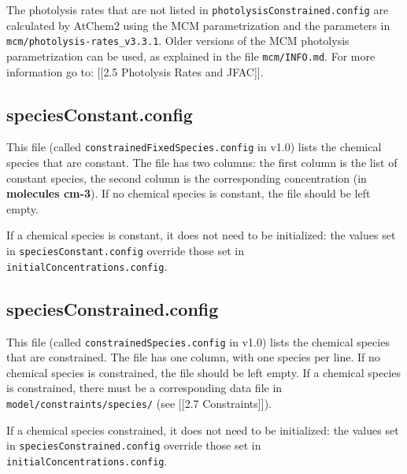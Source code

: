 The photolysis rates that are not listed in
\texttt{photolysisConstrained.config} are calculated by AtChem2 using
the MCM parametrization and the parameters in
\texttt{mcm/photolysis-rates\_v3.3.1}. Older versions of the MCM
photolysis parametrization can be used, as explained in the file
\texttt{mcm/INFO.md}. For more information go to: {[}{[}2.5 Photolysis
Rates and JFAC{]}{]}.

\subsection{speciesConstant.config}\label{speciesconstant.config}

This file (called \texttt{constrainedFixedSpecies.config} in v1.0) lists
the chemical species that are constant. The file has two columns: the
first column is the list of constant species, the second column is the
corresponding concentration (in \textbf{molecules cm-3}). If no chemical
species is constant, the file should be left empty.

If a chemical species is constant, it does not need to be initialized:
the values set in \texttt{speciesConstant.config} override those set in
\texttt{initialConcentrations.config}.

\subsection{speciesConstrained.config}\label{speciesconstrained.config}

This file (called \texttt{constrainedSpecies.config} in v1.0) lists the
chemical species that are constrained. The file has one column, with one
species per line. If no chemical species is constrained, the file should
be left empty. If a chemical species is constrained, there must be a
corresponding data file in \texttt{model/constraints/species/} (see
{[}{[}2.7 Constraints{]}{]}).

If a chemical species constrained, it does not need to be initialized:
the values set in \texttt{speciesConstrained.config} override those set
in \texttt{initialConcentrations.config}.
